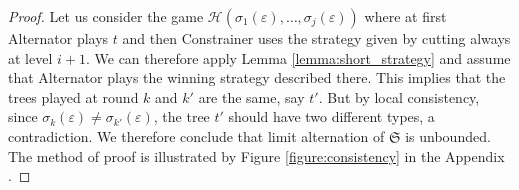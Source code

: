 \begin{proof}
Let us consider the game $\mathcal{H}( \sigma_1(\varepsilon), \dots, \sigma_j(\varepsilon))$ where at first Alternator plays $t$ and then Constrainer uses the strategy given by cutting always at level $i+1$. We can therefore apply Lemma \ref{lemma:short_strategy} and assume that Alternator plays the winning strategy described there. This implies that the trees played at round $k$ and $k'$ are the same, say $t'$. But by local consistency, since $\sigma_k(\varepsilon)\neq \sigma_{k'}(\varepsilon)$, the tree $t'$ should have two different types, a contradiction. We therefore conclude that limit alternation of $\mathfrak{S}$ is unbounded. The method of proof is illustrated by Figure \ref{figure:consistency} in the Appendix .
\end{proof}
